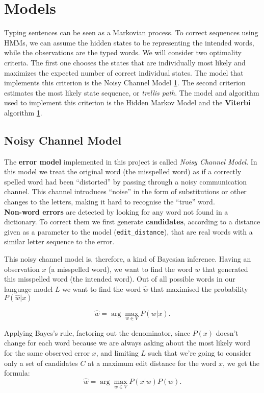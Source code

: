 \chapter{Models}

Typing sentences can be seen as a Markovian process. To correct sequences using HMMs, we can assume the 
hidden states to be representing the intended words, while the observations are the typed words.
We will consider two optimality criteria. The first one chooses the states that are individually most likely and 
maximizes the expected number of correct individual states. The model that implements this criterion is the 
Noisy Channel Model \ref{}.
The second criterion estimates the most likely state sequence, or \textit{trellis path}. The model and algorithm 
used to implement this criterion is the Hidden Markov Model and the \textbf{Viterbi} algorithm \ref{}.


\section{Noisy Channel Model}
\label{section:ncm}
The \textbf{error model} implemented in this project is called \textit{Noisy Channel Model}.
In this model we treat the original word (the misspelled word) as if a correctly spelled word had been “distorted” 
by passing through  a noisy communication channel. This channel introduces “noise” in the form of substitutions 
or other changes to the letters, making it hard to recognise the “true” word. \\


\textbf{Non-word errors} are detected by looking for any word not found in a dictionary. To correct them we first 
generate \textbf{candidates}, according to a distance given as a parameter to the model (\texttt{edit\_distance}), 
that are real words with a similar letter sequence to the error. 


This noisy channel model is, therefore, a kind of Bayesian inference.
Having an observation $x$ (a misspelled word), we want to find the word $w$ that generated this misspelled word (the intended word).
Out of all possible words in our language model $L$ we want to find the word $\hat{w}$ that maximised the 
probability $P(\hat{w}|x)$

\begin{equation}\label{eq:4.1}
\hat{w} = \arg\max_{w \in V} P(w|x) \mbox{.}
\end{equation}

Applying Bayes's rule, factoring out the denominator, since $P(x)$ doesn’t change for each word because we 
are always asking about the most likely word for the same observed error $x$,  and limiting $L$ such that we're 
going to consider only a set of candidates $C$ at a maximum edit distance for the word $x$, we get the formula:
\begin{equation}\label{eq:4.2}
\hat{w} = \arg\max_{w \in V} {P(x|w)P(w)} \mbox{.}
\end{equation}


